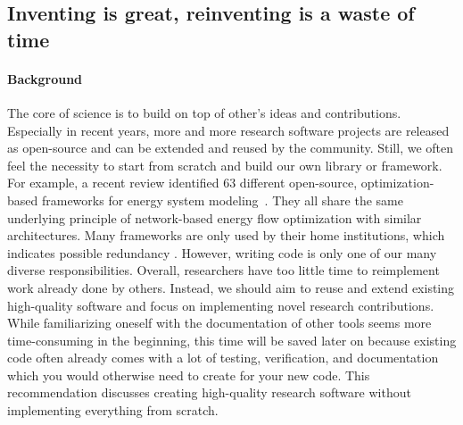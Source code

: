 \subsection{Inventing is great, reinventing is a waste of time}
\label{sec:reuseAndExtend}

\paragraph{Background} The core of science is to build on top of other's ideas and contributions. Especially in recent years, more and more research software projects are released as open-source and can be extended and reused by the community. Still, we often feel the necessity to start from scratch and build our own library or framework. For example, a recent review identified 63 different open-source, optimization-based frameworks for energy system modeling~\cite{hoffmann_review_2024}. They all share the same underlying principle of network-based energy flow optimization with similar architectures. Many frameworks are only used by their home institutions, which indicates possible redundancy \cite{hoffmann_review_2024}. However, writing code is only one of our many diverse responsibilities.  
Overall, researchers have too little time to reimplement work already done by others. Instead, we should aim to reuse and extend existing high-quality software and focus on implementing novel research contributions. While familiarizing oneself with the documentation of other tools seems more time-consuming in the beginning, this time will be saved later on because existing code often already comes with a lot of testing, verification, and documentation which you would otherwise need to create for your new code.
This recommendation discusses creating high-quality research software without implementing everything from scratch. 

